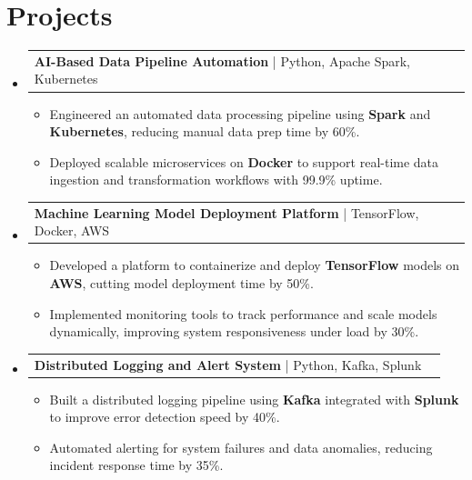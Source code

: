 \documentclass[letterpaper,11pt]{article}
\makeatletter
\newcommand{\resumeItem}[1]{
  \item\footnotesize{
    {#1 \vspace{-2pt}}
  }
}
\newcommand{\resumeProjectHeading}[2]{
    \item
    \begin{tabular*}{1.001\textwidth}{l@{\extracolsep{\fill}}r}
      \small#1 & \textbf{\small #2}\\
    \end{tabular*}\vspace{-7pt}
}
\newcommand{\resumeSubHeadingListStart}{\begin{itemize}[leftmargin=0pt, label={}]}
\newcommand{\resumeSubHeadingListEnd}{\end{itemize}}
\newcommand{\resumeItemListStart}{\begin{itemize}[leftmargin=*]}
\newcommand{\resumeItemListEnd}{\end{itemize}\vspace{-5pt}}
\makeatother
\begin{document}
\section{Projects}
    \vspace{-5pt}
    \resumeSubHeadingListStart
      \resumeProjectHeading
          {\textbf{AI-Based Data Pipeline Automation} | Python, Apache Spark, Kubernetes}{}
          \resumeItemListStart
              \resumeItem{Engineered an automated data processing pipeline using \textbf{Spark} and \textbf{Kubernetes}, reducing manual data prep time by 60\%.}
              \resumeItem{Deployed scalable microservices on \textbf{Docker} to support real-time data ingestion and transformation workflows with 99.9\% uptime.}
          \resumeItemListEnd
          \vspace{-12pt}
      \resumeProjectHeading
          {\textbf{Machine Learning Model Deployment Platform} | TensorFlow, Docker, AWS}{}
          \resumeItemListStart
              \resumeItem{Developed a platform to containerize and deploy \textbf{TensorFlow} models on \textbf{AWS}, cutting model deployment time by 50\%.}
              \resumeItem{Implemented monitoring tools to track performance and scale models dynamically, improving system responsiveness under load by 30\%.}
          \resumeItemListEnd
          \vspace{-12pt}
      \resumeProjectHeading
          {\textbf{Distributed Logging and Alert System} | Python, Kafka, Splunk}{}
          \resumeItemListStart
              \resumeItem{Built a distributed logging pipeline using \textbf{Kafka} integrated with \textbf{Splunk} to improve error detection speed by 40\%.}
              \resumeItem{Automated alerting for system failures and data anomalies, reducing incident response time by 35\%.}
          \resumeItemListEnd 
    \resumeSubHeadingListEnd
\end{document}
